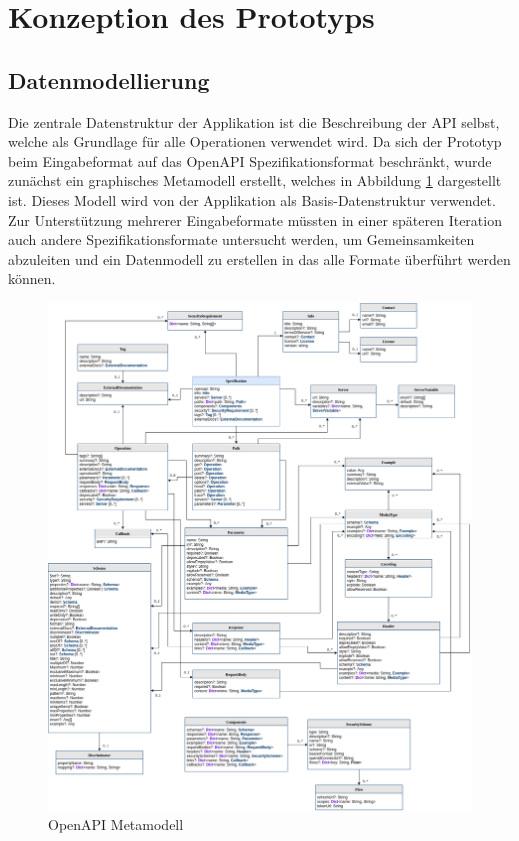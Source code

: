 
\section{Konzeption des Prototyps}


\subsection{Datenmodellierung}

Die zentrale Datenstruktur der Applikation ist die Beschreibung der API selbst, welche als Grundlage für alle Operationen verwendet wird. Da sich der Prototyp beim Eingabeformat auf das OpenAPI Spezifikationsformat beschränkt, wurde zunächst ein graphisches Metamodell erstellt, welches in Abbildung \ref{fig:openapi} dargestellt ist. Dieses Modell wird von der Applikation als Basis-Datenstruktur verwendet. Zur Unterstützung mehrerer Eingabeformate müssten in einer späteren Iteration auch andere Spezifikationsformate untersucht werden, um Gemeinsamkeiten abzuleiten und ein Datenmodell zu erstellen in das alle Formate überführt werden können. \\

\begin{figure}
  \includegraphics[width=\textwidth,height=\textheight,keepaspectratio]{../images/open-api.png}
  \caption{OpenAPI Metamodell}
  \label{fig:openapi}
\end{figure}

